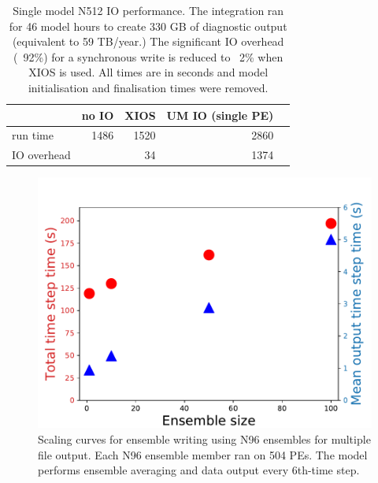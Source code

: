 \documentclass[twocolumn, 12pt]{paper}
\begin{document}
\begin{table}[H]
	\begin{center}
	\begin{tabular}{|l|r|r|r|r}
		\hline
		             & no IO   & XIOS   & UM IO (single PE) 	\\ \hline
		run time     & 1486    & 1520   & 2860 								\\
    IO overhead  &         & 34     & 1374 								\\
		\hline
	\end{tabular}
	\caption{Single model N512 IO performance. The integration ran for 46 model hours to create 330 GB of diagnostic output (equivalent to 59 TB/year.) The significant IO overhead (~92\%) for a synchronous write is reduced to ~2\% when XIOS is used. All times are in seconds and model initialisation and finalisation times were removed.}
  \label{table3}
	\end{center}
\end{table}

\begin{figure}[H]
	\includegraphics[width=\columnwidth]{figures/ens-n96.pdf}
	\caption{Scaling curves for ensemble writing using N96 ensembles for multiple file output. Each N96 ensemble member ran on 504 PEs. The model performs ensemble averaging and data output every 6th-time step.}
  \label{first-ensemble-runs-n96}
\end{figure}
\end{document}
